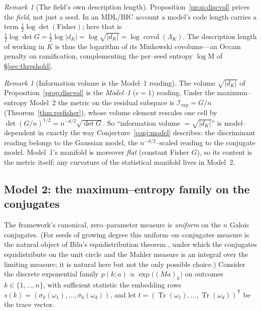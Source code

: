 \documentclass[11pt]{article}
\theoremstyle{plain}
\theoremstyle{definition}
\theoremstyle{remark}
\newtheorem{remark}[theorem]{Remark}
\newcommand{\K}{K}
\newcommand{\Tr}{\operatorname{Tr}}
\newcommand{\Mah}{\mathrm{M}}
\newcommand{\Fish}{\mathcal{I}}
\newcommand{\GG}{G}
\newcommand{\transpose}{^{\mathsf{T}}}
\begin{document}
\begin{remark}[The field's own description length]\label{rem:fieldmdl}
Proposition~\ref{prop:discvol} prices the \emph{field}, not just a seed. In an MDL/BIC account
\cite{Rissanen,Schwarz} a model's code length carries a term $\tfrac12\log\det(\text{Fisher})$; here that is
$\tfrac12\log\det\GG=\tfrac12\log|d_\K|=\log\sqrt{|d_\K|}=\log\operatorname{covol}(\Lambda_\K)$. The
description length of working in $\K$ is thus the logarithm of its Minkowski covolume---an Occam penalty on
ramification, complementing the per--seed entropy $\log\Mah$ of \S\ref{sec:threshold}.
\end{remark}

\begin{remark}[Information volume is the Model--1 reading]\label{rem:volmodel}
The volume $\sqrt{|d_\K|}$ of Proposition~\ref{prop:discvol} is the \emph{Model--1} ($c=1$) reading. Under the
maximum--entropy Model~2 the metric on the residual subspace is $\Fish_{\mathrm{exp}}=\GG/n$
(Theorem~\ref{thm:resfisher}), whose volume element rescales one cell by
$\det(\GG/n)^{1/2}=n^{-d/2}\sqrt{\det\GG}$. So ``information volume $=\sqrt{|d_\K|}$'' is model--dependent in
exactly the way Conjecture~\ref{conj:model} describes: the discriminant reading belongs to the Gaussian
model, the $n^{-d/2}$--scaled reading to the conjugate model. Model~1's manifold is moreover \emph{flat}
(constant Fisher $\GG$), so its content is the metric itself; any curvature of the statistical manifold lives
in Model~2.
\end{remark}

\subsection{Model 2: the maximum--entropy family on the conjugates}
The framework's canonical, zero--parameter measure is \emph{uniform} on the $n$ Galois conjugates. (For seeds
of growing degree this uniform--on--conjugates measure is the natural object of Bilu's equidistribution
theorem \cite{Bilu}, under which the conjugates equidistribute on the unit circle and the Mahler measure is an
integral over the limiting measure; it is natural here but not the only possible choice.) Consider
the discrete exponential family $p(k;a)\propto\exp\big((Ma)_k\big)$ on outcomes $k\in\{1,\dots,n\}$, with
sufficient statistic the embedding rows $s(k)=(\sigma_k(\omega_1),\dots,\sigma_k(\omega_d))$, and let
$t=(\Tr(\omega_1),\dots,\Tr(\omega_d))\transpose$ be the trace vector.
\end{document}
